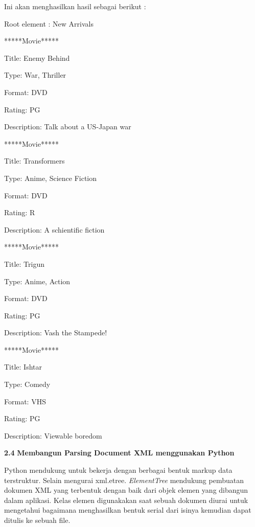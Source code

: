 \noindent 
Ini akan menghasilkan hasil sebagai berikut : \par
\noindent 
Root element : New Arrivals \par
\noindent 
*****Movie***** \par
\noindent 
Title: Enemy Behind \par
\noindent 
Type: War, Thriller \par
\noindent 
Format: DVD \par
\noindent 
Rating: PG \par
\noindent 
Description: Talk about a US-Japan war \par
\noindent 
*****Movie***** \par
\noindent 
Title: Transformers \par
\noindent 
Type: Anime, Science Fiction \par
\noindent 
Format: DVD \par
\noindent 
Rating: R \par
\noindent 
Description: A schientific fiction \par
\noindent 
*****Movie***** \par
\noindent 
Title: Trigun \par
\noindent 
Type: Anime, Action \par
\noindent 
Format: DVD \par
\noindent 
Rating: PG \par
\noindent 
Description: Vash the Stampede! \par
\noindent 
*****Movie***** \par
\noindent 
Title: Ishtar \par
\noindent 
Type: Comedy \par
\noindent 
Format: VHS \par
\noindent 
Rating: PG \par
\noindent 
Description: Viewable boredom \par
\vspace{12pt}
\noindent 
\textbf{2.4}\textbf{ Membangun Parsing Document XML menggunakan Python} \par
\noindent 
 \hspace*{0.5in} Python mendukung untuk bekerja dengan berbagai bentuk markup data terstruktur. Selain mengurai xml.etree. \textit{ElementTree} mendukung pembuatan dokumen XML yang terbentuk dengan baik dari objek elemen yang dibangun dalam aplikasi. Kelas elemen digunakakan saat sebuah dokumen diurai untuk mengetahui bagaimana menghasilkan bentuk serial dari isinya kemudian dapat ditulis ke sebuah file.  \par
